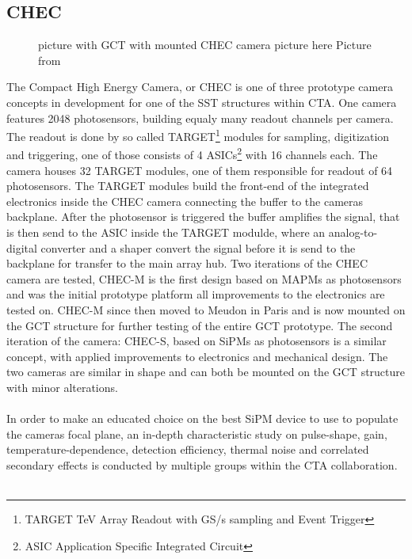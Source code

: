 \documentclass[12pt,article,type=msc,colorback,accentcolor=tud9c]{tudthesis}
\begin{document}
\subsection{CHEC}
\begin{figure}[t!]
\begin{centering}
\caption{picture with GCT with mounted CHEC camera picture here Picture from }
\label{fig:GCT_Pic}
\end{centering}
\end{figure}


The Compact High Energy Camera, or CHEC is one of three prototype camera concepts in development for one of the SST structures within CTA. One camera features 2048 photosensors, building equaly many readout channels per camera. The readout is done by so called TARGET\footnote{TARGET TeV Array Readout with GS/s sampling and Event Trigger} modules for sampling, digitization and triggering, one of those consists of 4 ASICs\footnote{ASIC Application Specific Integrated Circuit} with 16 channels each. The camera houses 32 TARGET modules, one of them responsible for readout of 64 photosensors. The TARGET modules build the front-end of the integrated electronics inside the CHEC camera connecting the buffer to the cameras backplane. After the photosensor is triggered the buffer amplifies the signal, that is then send to the ASIC inside the TARGET modulde, where an analog-to-digital converter and a shaper convert the signal before it is send to the backplane for transfer to the main array hub. Two iterations of the CHEC camera are tested, CHEC-M is the first design based on MAPMs as photosensors and was the initial prototype platform all improvements to the electronics are tested on. CHEC-M since then moved to Meudon in Paris and is now mounted on the GCT structure for further testing of the entire GCT prototype. The second iteration of the camera: CHEC-S, based on SiPMs as photosensors is a similar concept, with applied improvements to electronics and mechanical design. The two cameras are similar in shape and can both be mounted on the GCT structure with minor alterations.\\\\

In order to make an educated choice on the best SiPM device to use to populate the cameras focal plane, an in-depth characteristic study on pulse-shape, gain, temperature-dependence, detection efficiency, thermal noise and correlated secondary effects is conducted by multiple groups within the CTA collaboration.\\\\
\end{document}
